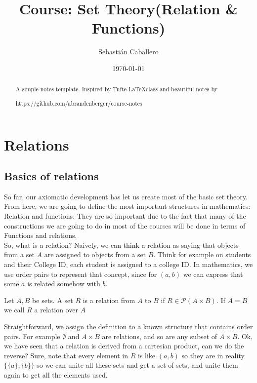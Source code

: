 \documentclass{tufte-handout}
\title{Course: Set Theory(Relation \& Functions)}
\author{Sebastián Caballero}
\date{\today}
\begin{document}
\maketitle

\begin{abstract}
\noindent
A simple notes template. Inspired by Tufte-\LaTeX class and beautiful notes by \begin{verbatim*}
	https://github.com/abrandenberger/course-notes
\end{verbatim*}
\end{abstract}
\section{Relations}
\subsection{Basics of relations}
So far, our axiomatic development has let us create most of the basic set theory. From here, we are going to define the most important structures in mathematics: Relation and functions. They are so important due to the fact that many of the constructions we are going to do in most of the courses will be done in terms of Functions and relations.\\

So, what is a relation? Naively, we can think a relation as saying that objects from a set $A$ are assigned to objects from a set $B$. Think for example on students and their College ID, each student is assigned to a college ID. In mathematics, we use order pairs to represent that concept, since for $(a, b)$ we can express that some $a$ is related somehow with $b$.\\

\begin{definition}[Relation]
	Let $A, B$ be sets. A set $R$ is a relation from $A$ to $B$ if $R \in \mathcal{P}(A \times B)$. If $A = B$ we call $R$ a relation over $A$
\end{definition}

Straightforward, we assign the definition to a known structure that contains order pairs. For example $\emptyset$ and $A \times B$ are relations, and so are any subset of $A \times B$. Ok, we have seen that a relation is derived from a cartesian product, can we do the reverse? Sure, note that every element in $R$ is like $(a, b)$ so they are in reality $\{\{a\}, \{b\}\}$ so we can unite all these sets and get a set of sets, and unite them again to get all the elements used. 
\end{document}
